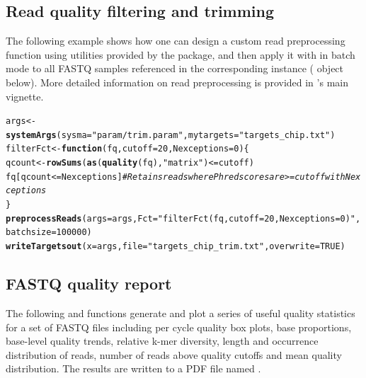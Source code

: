 \documentclass{article}\usepackage[]{graphicx}\usepackage[]{color}
\makeatletter
\newcommand{\hlnum}[1]{\textcolor[rgb]{0.686,0.059,0.569}{#1}}%
\newcommand{\hlstr}[1]{\textcolor[rgb]{0.192,0.494,0.8}{#1}}%
\newcommand{\hlcom}[1]{\textcolor[rgb]{0.678,0.584,0.686}{\textit{#1}}}%
\newcommand{\hlopt}[1]{\textcolor[rgb]{0,0,0}{#1}}%
\newcommand{\hlstd}[1]{\textcolor[rgb]{0.345,0.345,0.345}{#1}}%
\newcommand{\hlkwa}[1]{\textcolor[rgb]{0.161,0.373,0.58}{\textbf{#1}}}%
\newcommand{\hlkwb}[1]{\textcolor[rgb]{0.69,0.353,0.396}{#1}}%
\newcommand{\hlkwc}[1]{\textcolor[rgb]{0.333,0.667,0.333}{#1}}%
\newcommand{\hlkwd}[1]{\textcolor[rgb]{0.737,0.353,0.396}{\textbf{#1}}}%
\newenvironment{kframe}{%
 \def\at@end@of@kframe{}%
 \ifinner\ifhmode%
  \def\at@end@of@kframe{\end{minipage}}%
  \begin{minipage}{\columnwidth}%
 \fi\fi%
 \def\FrameCommand##1{\hskip\@totalleftmargin \hskip-\fboxsep
 \colorbox{shadecolor}{##1}\hskip-\fboxsep
     \hskip-\linewidth \hskip-\@totalleftmargin \hskip\columnwidth}%
 \MakeFramed {\advance\hsize-\width
   \@totalleftmargin\z@ \linewidth\hsize
   \@setminipage}}%
 {\par\unskip\endMakeFramed%
 \at@end@of@kframe}
\newenvironment{knitrout}{}{} %
\makeatother
\begin{document}
\subsection{Read quality filtering and trimming}
The following example shows how one can design a custom read preprocessing function using utilities provided by the  package, and then apply it with  in batch mode to all FASTQ samples referenced in the corresponding  instance ( object below). More detailed information on read preprocessing is provided in 's main vignette.
\begin{knitrout}
\color{fgcolor}\begin{kframe}
\begin{alltt}
\hlstd{args} \hlkwb{<-} \hlkwd{systemArgs}\hlstd{(}\hlkwc{sysma}\hlstd{=}\hlstr{"param/trim.param"}\hlstd{,} \hlkwc{mytargets}\hlstd{=}\hlstr{"targets_chip.txt"}\hlstd{)}
\hlstd{filterFct} \hlkwb{<-} \hlkwa{function}\hlstd{(}\hlkwc{fq}\hlstd{,} \hlkwc{cutoff}\hlstd{=}\hlnum{20}\hlstd{,} \hlkwc{Nexceptions}\hlstd{=}\hlnum{0}\hlstd{) \{}
    \hlstd{qcount} \hlkwb{<-} \hlkwd{rowSums}\hlstd{(}\hlkwd{as}\hlstd{(}\hlkwd{quality}\hlstd{(fq),} \hlstr{"matrix"}\hlstd{)} \hlopt{<=} \hlstd{cutoff)}
    \hlstd{fq[qcount} \hlopt{<=} \hlstd{Nexceptions]} \hlcom{# Retains reads where Phred scores are >= cutoff with N exceptions}
\hlstd{\}}
\hlkwd{preprocessReads}\hlstd{(}\hlkwc{args}\hlstd{=args,} \hlkwc{Fct}\hlstd{=}\hlstr{"filterFct(fq, cutoff=20, Nexceptions=0)"}\hlstd{,} \hlkwc{batchsize}\hlstd{=}\hlnum{100000}\hlstd{)}
\hlkwd{writeTargetsout}\hlstd{(}\hlkwc{x}\hlstd{=args,} \hlkwc{file}\hlstd{=}\hlstr{"targets_chip_trim.txt"}\hlstd{,} \hlkwc{overwrite}\hlstd{=}\hlnum{TRUE}\hlstd{)}
\end{alltt}
\end{kframe}
\end{knitrout}

\subsection{FASTQ quality report}
The following  and  functions generate and plot a series of
useful quality statistics for a set of FASTQ files including per cycle quality
box plots, base proportions, base-level quality trends, relative k-mer
diversity, length and occurrence distribution of reads, number of reads above
quality cutoffs and mean quality distribution. The results are written to a PDF file named 
\href{run:./results/fastqReport.pdf}{}.
\end{document}
